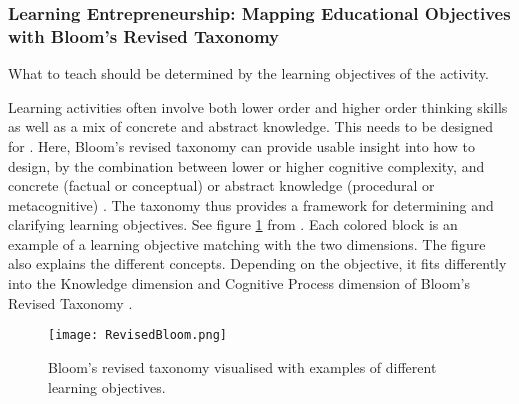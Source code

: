 


%


  \subsubsection{Learning Entrepreneurship: Mapping Educational Objectives with Bloom's Revised Taxonomy}

  What to teach should be determined by the learning objectives of the activity.

  Learning activities often involve both lower order and higher order thinking skills as well as a mix of concrete and abstract knowledge. This needs to be designed for . Here, Bloom's revised taxonomy can provide usable insight into how to design, by the combination between lower or higher cognitive complexity, and concrete (factual or conceptual) or abstract knowledge (procedural or metacognitive) \citep{cheong}. The taxonomy thus provides a framework for determining and clarifying learning objectives. See figure \ref{fig:revised-bloom} from \cite{heer}. Each colored block is an example of a learning objective matching with the two dimensions. The figure also explains the different concepts. Depending on the objective, it fits differently into the Knowledge dimension and Cognitive Process dimension of Bloom's Revised Taxonomy \citep{krathwohl}.

  \begin{figure}[h]
    \centering
    \texttt{[image: RevisedBloom.png]}
    \caption{Bloom's revised taxonomy visualised with examples of different learning objectives.}
    \label{fig:revised-bloom}
\end{figure}

